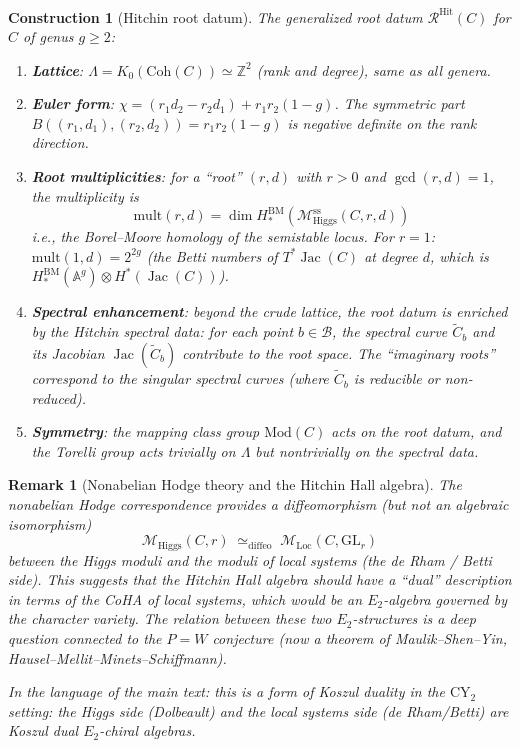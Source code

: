 \documentclass[11pt]{article}
\theoremstyle{garamondthm}
\theoremstyle{garamonddef}
\newtheorem{construction}[theorem]{Construction}
\theoremstyle{garamondrem}
\newtheorem{remark}[theorem]{Remark}
\newcommand{\Coh}{\mathrm{Coh}}
\newcommand{\CY}{\mathrm{CY}}
\newcommand{\Etwo}{E_2}
\newcommand{\cB}{\mathcal{B}}
\newcommand{\cM}{\mathcal{M}}
\newcommand{\Higgs}{\mathrm{Higgs}}
\newcommand{\Loc}{\mathrm{Loc}}
\newcommand{\Hit}{\mathrm{Hit}}
\newcommand{\GL}{\mathrm{GL}}
\DeclareMathOperator{\Jac}{Jac}
\begin{document}
\begin{construction}[Hitchin root datum]
\label{constr:hitchin-root-datum}
The generalized root datum $\mathcal{R}^{\Hit}(C)$ for $C$ of genus $g \geq 2$:
\begin{enumerate}[label=(\roman*)]
 \item \textbf{Lattice}: $\Lambda = K_0(\Coh(C)) \simeq \mathbb{Z}^2$ (rank and degree), same as all genera.
 \item \textbf{Euler form}: $\chi = (r_1 d_2 - r_2 d_1) + r_1 r_2(1-g)$. The symmetric part $B((r_1,d_1),(r_2,d_2)) = r_1 r_2(1-g)$ is negative definite on the rank direction.
 \item \textbf{Root multiplicities}: for a ``root'' $(r,d)$ with $r > 0$ and $\gcd(r,d) = 1$, the multiplicity is
 \[
 \mathrm{mult}(r, d) = \dim H^{\mathrm{BM}}_*(\cM^{\mathrm{ss}}_{\Higgs}(C, r, d))
 \]
 i.e., the Borel--Moore homology of the semistable locus. For $r = 1$: $\mathrm{mult}(1, d) = 2^{2g}$ (the Betti numbers of $T^*\Jac(C)$ at degree $d$, which is $H^{\mathrm{BM}}_*(\mathbb{A}^{g}) \otimes H^*(\Jac(C))$).
 \item \textbf{Spectral enhancement}: beyond the crude lattice, the root datum is enriched by the \emph{Hitchin spectral data}: for each point $b \in \cB$, the spectral curve $\widetilde{C}_b$ and its Jacobian $\Jac(\widetilde{C}_b)$ contribute to the root space. The ``imaginary roots'' correspond to the singular spectral curves (where $\widetilde{C}_b$ is reducible or non-reduced).
 \item \textbf{Symmetry}: the mapping class group $\mathrm{Mod}(C)$ acts on the root datum, and the Torelli group acts trivially on $\Lambda$ but nontrivially on the spectral data.
\end{enumerate}
\end{construction}

\begin{remark}[Nonabelian Hodge theory and the Hitchin Hall algebra]
\label{rem:naht}
The nonabelian Hodge correspondence provides a diffeomorphism (but not an algebraic isomorphism)
\[
 \cM_{\Higgs}(C, r) \;\simeq_{\mathrm{diffeo}}\; \cM_{\Loc}(C, \GL_r)
\]
between the Higgs moduli and the moduli of local systems (the de Rham / Betti side). This suggests that the Hitchin Hall algebra should have a ``dual'' description in terms of the CoHA of local systems, which would be an $\Etwo$-algebra governed by the \emph{character variety}. The relation between these two $\Etwo$-structures is a deep question connected to the $P = W$ conjecture (now a theorem of Maulik--Shen--Yin, Hausel--Mellit--Minets--Schiffmann).

In the language of the main text: this is a form of \emph{Koszul duality} in the $\CY_2$ setting: the Higgs side (Dolbeault) and the local systems side (de Rham/Betti) are Koszul dual $\Etwo$-chiral algebras.
\end{remark}
\end{document}
